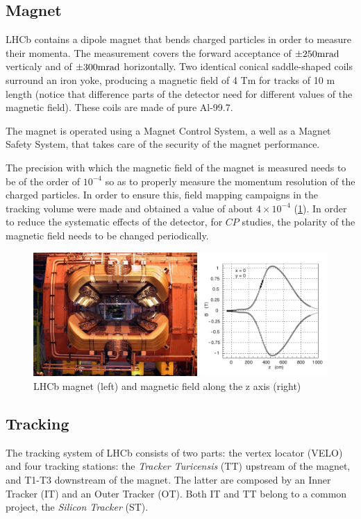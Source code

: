 \subsection{Magnet} %
LHCb contains a dipole magnet that bends charged particles in order to measure their momenta. The measurement covers the forward acceptance of $\pm 250 \rm mrad$ verticaly and of $\pm 300 \rm mrad$ horizontally. Two identical conical saddle-shaped coils surround an iron yoke, producing a magnetic field of 4 Tm for tracks of 10 m length (notice that difference parts of the detector need for different values of the magnetic field). These coils are made of pure Al-99.7. 

The magnet is operated using a Magnet Control System, a well as a Magnet Safety System, that takes care of the security of the magnet performance. 

The precision with which the magnetic field of the magnet is measured needs to be of the order of $10^{-4}$ so as to properly measure the momentum resolution of the charged particles. In order to ensure this, field mapping campaigns in the tracking volume were made and obtained a value of about $4\times 10^{-4}$ (\ref{fig:lhcbmagnet}). In order to reduce the systematic effects of the detector,  for $CP$ studies, the polarity of the magnetic field needs to be changed periodically. 

\begin{figure} [htb!]
\begin{center}
\includegraphics[scale=0.35]{figs/magnet.jpg}
\caption{LHCb magnet (left) and magnetic field along the z axis (right)\label{fig:lhcbmagnet}}
\end{center}
\end{figure}

\subsection{Tracking} %
\label{sec:Tracking}
The tracking system of LHCb consists of two parts: the vertex locator (VELO) and four tracking stations: the \textit{Tracker Turicensis} (TT) upstream of the magnet, and T1-T3 downstream of the magnet. The latter are composed by an Inner Tracker (IT) and an Outer Tracker (OT). Both IT and TT belong to a common project, the \textit{Silicon Tracker} (ST). 

